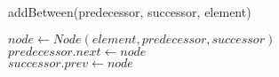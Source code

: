 \documentclass{article}
\begin{document}
\begin{algorithm}
\caption{addBetween(predecessor, successor, element)}
$node\gets Node(element, predecessor, successor)$ \\
$predecessor.next\gets node$ \\
$successor.prev\gets node$
\end{algorithm}
\end{document}
